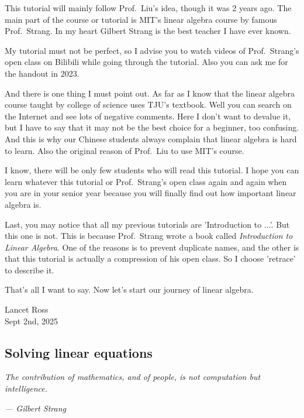 \documentclass[12pt]{ctexart}
\begin{document}
This tutorial will mainly follow Prof.\ Liu's idea, though it was 2 years ago. The main part
of the course or tutorial is MIT's linear algebra course by famous Prof.\ Strang. In my heart
Gilbert Strang is the best teacher I have ever known. 

My tutorial must not be perfect, so I advise you to watch videos of Prof.\ Strang's open
class on Bilibili while going through the tutorial. Also you can ask me for the handout
in 2023.

And there is one thing I must point out. As far as I know that the linear algebra course
taught by college of science uses TJU's textbook. Well you can search on the Internet and
see lots of negative comments. Here I don't want to devalue it, but I have to say that it
may not be the best choice for a beginner, too confusing. And this is why our Chinese
students always complain that linear algebra is hard to learn. Also the original reason
of Prof.\ Liu to use MIT's course.

I know, there will be only few students who will read this tutorial. I hope you can learn
whatever this tutorial or Prof.\ Strang's open class again and again when you are in your
senior year because you will finally find out how important linear algebra is.

Last, you may notice that all my previous tutorials are 'Introduction to ...'. But this one
is not. This is because Prof.\ Strang wrote a book called \textit{Introduction to Linear
Algebra}. One of the reasons is to prevent duplicate names, and the other is that this
tutorial is actually a compression of his open class. So I choose 'retrace' to describe
it.

That's all I want to say. Now let's start our journey of linear algebra.

\begin{flushright}
  Lancet Ross\\
  Sept 2nd, 2025
\end{flushright}

\newpage
\thispagestyle{empty}
\begin{center}
    \vspace*{96pt}
    \fontsize{60}{60}\par
    \fontsize{26}{31.2}\section{\textbf{Solving linear equations}}\par %
    \vspace{25pt}
    \begin{center}
      \fontsize{18}{21.6}\customfont\textit{The contribution of mathematics, and of people,
      is not computation but intelligence.}
    \end{center}
    \begin{flushright}
      \fontsize{18}{21.6}\customfont\textit{--- Gilbert Strang}
    \end{flushright}
    \vfill
\end{center}
\end{document}

